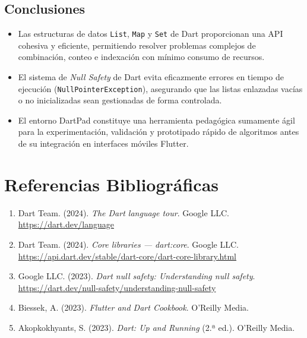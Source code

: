 \documentclass[12pt,a4paper]{article}
\begin{document}
\subsection{Conclusiones}
\begin{itemize}[leftmargin=*]
    \item Las estructuras de datos \texttt{List}, \texttt{Map} y \texttt{Set} de Dart proporcionan una API cohesiva y eficiente, permitiendo resolver problemas complejos de combinación, conteo e indexación con mínimo consumo de recursos.
    \item El sistema de \textit{Null Safety} de Dart evita eficazmente errores en tiempo de ejecución (\texttt{NullPointerException}), asegurando que las listas enlazadas vacías o no inicializadas sean gestionadas de forma controlada.
    \item El entorno DartPad constituye una herramienta pedagógica sumamente ágil para la experimentación, validación y prototipado rápido de algoritmos antes de su integración en interfaces móviles Flutter.
\end{itemize}

\section{Referencias Bibliográficas}
\begin{enumerate}[leftmargin=*]
    \item Dart Team. (2024). \textit{The Dart language tour}. Google LLC. \url{https://dart.dev/language}
    \item Dart Team. (2024). \textit{Core libraries — dart:core}. Google LLC. \url{https://api.dart.dev/stable/dart-core/dart-core-library.html}
    \item Google LLC. (2023). \textit{Dart null safety: Understanding null safety}. \url{https://dart.dev/null-safety/understanding-null-safety}
    \item Biessek, A. (2023). \textit{Flutter and Dart Cookbook}. O'Reilly Media.
    \item Akopkokhyants, S. (2023). \textit{Dart: Up and Running} (2.ª ed.). O'Reilly Media.
\end{enumerate}
\end{document}
